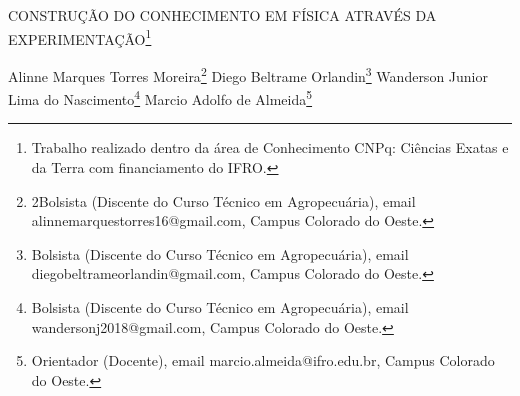 \documentclass[article,12pt,onesidea,4paper,english,brazil]{abntex2}
\begin{document}
	
	
	\frenchspacing 
	
	\begin{center}
		\LARGE CONSTRUÇÃO DO CONHECIMENTO EM FÍSICA ATRAVÉS DA
		EXPERIMENTAÇÃO\footnote{Trabalho realizado dentro da área de Conhecimento CNPq: Ciências Exatas e da Terra com
			financiamento do IFRO.}
		
		\normalsize
		Alinne Marques Torres Moreira\footnote{2Bolsista (Discente do Curso Técnico em Agropecuária), email alinnemarquestorres16@gmail.com,
			Campus Colorado do Oeste.} 
	Diego Beltrame Orlandin\footnote{Bolsista (Discente do Curso Técnico em Agropecuária), email diegobeltrameorlandin@gmail.com,
		Campus Colorado do Oeste.} 
		Wanderson Junior Lima do Nascimento\footnote{Bolsista (Discente do Curso Técnico em Agropecuária), email wandersonj2018@gmail.com, Campus Colorado do Oeste.} 
	Marcio Adolfo de Almeida\footnote{Orientador (Docente), email marcio.almeida@ifro.edu.br, Campus Colorado do Oeste.} 
	\end{center}
	
\end{document}
